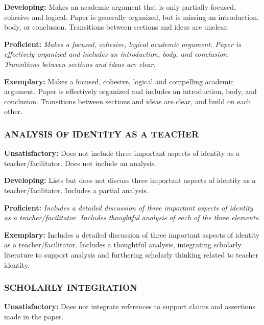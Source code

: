 \documentclass[
]{book}
\begin{document}
\textbf{Developing:} Makes an academic argument that is only partially focused, cohesive and logical. Paper is generally organized, but is missing an introduction, body, or conclusion. Transitions between sections and ideas are unclear.

\textbf{Proficient:} \emph{Makes a focused, cohesive, logical academic argument. Paper is effectively organized and includes an introduction, body, and conclusion. Transitions between sections and ideas are clear.}

\textbf{Exemplary:} Makes a focused, cohesive, logical and compelling academic argument. Paper is effectively organized and includes an introduction, body, and conclusion. Transitions between sections and ideas are clear, and build on each other.

\hypertarget{analysis-of-identity-as-a-teacher}{%
\subsubsection*{ANALYSIS OF IDENTITY AS A TEACHER}\label{analysis-of-identity-as-a-teacher}}

\textbf{Unsatisfactory:} Does not include three important aspects of identity as a teacher/facilitator. Does not include an analysis.

\textbf{Developing:} Lists but does not discuss three important aspects of identity as a teacher/facilitator. Includes a partial analysis.

\textbf{Proficient:} \emph{Includes a detailed discussion of three important aspects of identity as a teacher/facilitator. Includes thoughtful analysis of each of the three elements.}

\textbf{Exemplary:} Includes a detailed discussion of three important aspects of identity as a teacher/facilitator. Includes a thoughtful analysis, integrating scholarly literature to support analysis and furthering scholarly thinking related to teacher identity.

\hypertarget{scholarly-integration}{%
\subsubsection*{SCHOLARLY INTEGRATION}\label{scholarly-integration}}

\textbf{Unsatisfactory:} Does not integrate references to support claims and assertions made in the paper.
\end{document}

